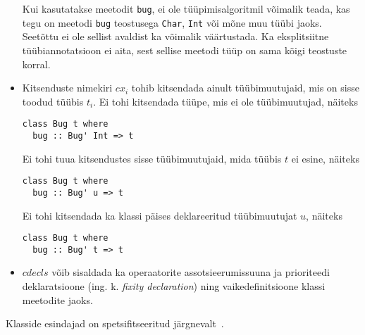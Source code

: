 \documentclass[12pt]{article}
\begin{document}
\begin{itemize}
            Kui kasutatakse meetodit \verb!bug!, ei ole tüüpimisalgoritmil võimalik teada, kas tegu on meetodi \verb!bug! teostusega \verb!Char!, \verb!Int! või mõne muu tüübi jaoks. Seetõttu ei ole sellist avaldist ka võimalik väärtustada. Ka eksplitsiitne tüübiannotatsioon ei aita, sest sellise meetodi tüüp on sama kõigi teostuste korral.
          \item
            Kitsenduste nimekiri $cx_i$ tohib kitsendada ainult tüübimuutujaid, mis on sisse toodud tüübis $t_i$. Ei tohi kitsendada tüüpe, mis ei ole tüübimuutujad, näiteks

            \begin{verbatim}class Bug t where
  bug :: Bug' Int => t\end{verbatim}

            Ei tohi tuua kitsendustes sisse tüübimuutujaid, mida tüübis $t$ ei esine, näiteks

            \begin{verbatim}class Bug t where
  bug :: Bug' u => t\end{verbatim}

            Ei tohi kitsendada ka klassi päises deklareeritud tüübimuutujat $u$, näiteks

            \begin{verbatim}class Bug t where
  bug :: Bug' t => t\end{verbatim}
          \item
            $cdecls$ võib sisaldada ka operaatorite assotsieerumissuuna ja prioriteedi deklaratsioone (ing. k. \textit{fixity declaration}) ning vaikedefinitsioone klassi meetodite jaoks.
        \end{itemize}

        Klasside esindajad on spetsifitseeritud järgnevalt~\cite{Has}.
\end{document}
